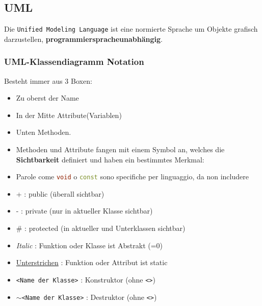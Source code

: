 \subsection{UML}

Die \texttt{Unified Modeling Language} ist eine normierte Sprache um Objekte grafisch 
darzustellen, \textbf{programmierspracheunabhängig}.

\subsubsection{UML-Klassendiagramm Notation}

Besteht immer aus 3 Boxen:\vspace{1em}

\noindent
\begin{minipage}{0.4\columnwidth}
\begin{center}
    
\end{center}
\end{minipage}
\begin{minipage}{0.57\columnwidth}
    \begin{itemize}
        \raggedright
        \item Zu oberst der Name 
        \item In der Mitte Attribute(Variablen)
        \item Unten Methoden.
        \item Methoden und Attribute fangen mit einem Symbol an, welches die \textbf{Sichtbarkeit} 
                definiert und haben ein bestimmtes Merkmal:
        \item Parole come \lstinline[language=C++]|void| o \lstinline[language=C++]|const| sono specifiche per linguaggio, da non includere
    \end{itemize}
\end{minipage}\vspace{1em}

\begin{itemize}[itemsep=1pt, parsep=0pt]
    \item + : public (überall sichtbar)
    \item - : private (nur in  aktueller Klasse sichtbar)
    \item \# : protected (in aktueller und Unterklassen sichtbar)
    \item \textit{Italic} : Funktion oder Klasse ist Abstrakt (=0)
    \item \underline{Unterstrichen} : Funktion oder Attribut ist static
    \item \verb|<Name der Klasse>| :  Konstruktor (ohne \verb|<>|)
    \item $\sim$\verb|<Name der Klasse>| : Destruktor (ohne \verb|<>|)
\end{itemize}




